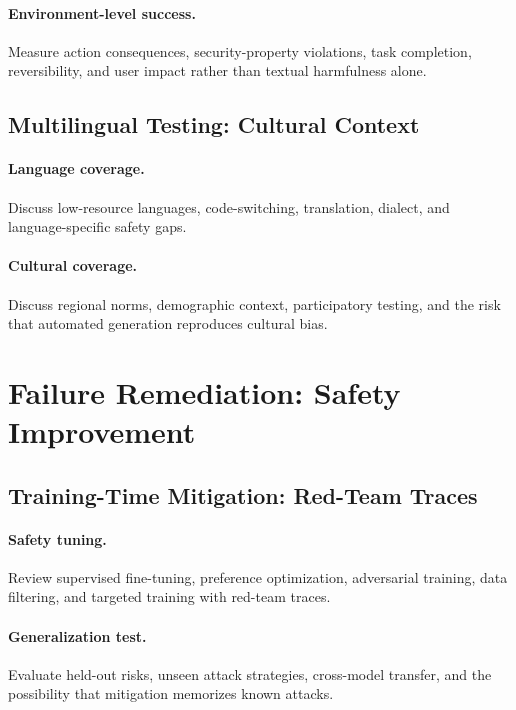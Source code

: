 \documentclass[review]{fcs}
\begin{document}
\paragraph{Environment-level success.}
Measure action consequences, security-property violations, task completion, reversibility, and user impact rather than textual harmfulness alone.

\subsection{Multilingual Testing: Cultural Context}

\paragraph{Language coverage.}
Discuss low-resource languages, code-switching, translation, dialect, and language-specific safety gaps.

\paragraph{Cultural coverage.}
Discuss regional norms, demographic context, participatory testing, and the risk that automated generation reproduces cultural bias.

\section{Failure Remediation: Safety Improvement}
\label{sec:mitigation}

\subsection{Training-Time Mitigation: Red-Team Traces}

\paragraph{Safety tuning.}
Review supervised fine-tuning, preference optimization, adversarial training, data filtering, and targeted training with red-team traces.

\paragraph{Generalization test.}
Evaluate held-out risks, unseen attack strategies, cross-model transfer, and the possibility that mitigation memorizes known attacks.
\end{document}
